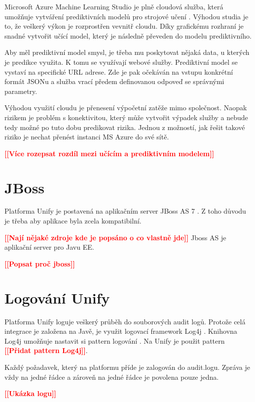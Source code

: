 \documentclass[thesis=M,czech]{FITthesis}[2012/10/20]
\newcommand{\todo}[1]{\textcolor{red}{\textbf{[[#1]]}}}
\newcommand{\blind}[1][1]{\textcolor{gray}{\Blindtext[#1][1]}}
\begin{document}
		Microsoft Azure Machine Learning Studio je plně cloudová služba, která umožňuje vytváření prediktivních modelů pro strojové učení \cite{msAzureStudio}. Výhodou studia je to, že veškerý výkon je rozprostřen vevnitř cloudu. Díky grafickému rozhraní je snadné vytvořit učící model, který je následně převeden do modelu prediktivního.
			
		Aby měl prediktivní model smysl, je třeba mu poskytovat nějaká data, u kterých je predikce využita. K tomu se využívají webové služby.
		Prediktivní model se vystaví na specifické URL adrese. Zde je pak očekáván na vstupu konkrétní formát JSONu a služba vrací předem definovanou odpoveď se správnými parametry.
		
		Výhodou využití cloudu je přenesení výpočetní zatěže mimo společnost. Naopak rizikem je problém s konektivitou, který může vytvořit výpadek služby a nebude tedy možné po tuto dobu predikovat rizika. Jednou z možností, jak řešit takové riziko je nechat přenést instanci MS Azure do své sítě.
		
		\todo{Více rozepsat rozdíl mezi učícím a prediktivním modelem}
		
	\section{JBoss}
		\label{sec:jboss}
		Platforma Unify je postavená na aplikačním server JBoss AS 7 \cite{unify}. Z toho důvodu je třeba aby aplikace byla zcela kompatibilní.
		 
		 \todo{Nají nějaké zdroje kde je popsáno o co vlastně jde}
		Jboss AS je aplikační server pro Javu EE\cite{jboss}. 
			
		\todo{Popsat proč jboss}
		\blind[1]	
					
	\section{Logování Unify}
		\label{sec:logging_unify}
		Platforma Unify loguje veškerý průběh do souborových audit logů. Protože celá integrace je založena na Javě, je využit logovací framework Log4j \cite{log4j}. Knihovna Log4j umožňuje nastavit si pattern logování \cite{log4jPatternLayout}. Na Unify je použit pattern \todo{Přidat pattern Log4j}. 
		
		Každý požadavek, který na platformu příde je zalogován do audit.logu. Zpráva je vždy na jedné řádce a zároveň na jedné řádce je povolena pouze jedna.
		
		
		\todo{Ukázka logu}
		
\end{document}
